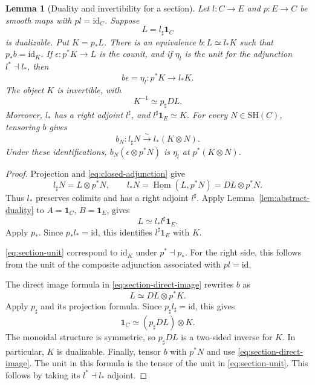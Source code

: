 \documentclass[11pt,reqno]{amsart}
\newtheorem{lemma}[theorem]{Lemma}
\theoremstyle{definition}
\theoremstyle{remark}
\theoremstyle{plain}
\numberwithin{equation}{section}
\newcommand{\SH}{\mathrm{SH}}
\newcommand{\one}{\mathbf 1}
\newcommand{\Hom}{\underline{\operatorname{Hom}}}
\begin{document}
\begin{lemma}[Duality and invertibility for a section]\label{lem:section}
Let \(l:C\to E\) and \(p:E\to C\) be smooth maps with \(pl=\mathrm{id}_C\).
Suppose
\[
 L=l_\sharp\one_C
\]
is dualizable.
Put \(K=p_*L\).
There is an equivalence \(b:L\simeq l_*K\) such that \(p_*b=\mathrm{id}_K\).
If \(\epsilon:p^*K\to L\) is the counit, and if \(\eta_l\) is the unit 
for the adjunction \(l^* \dashv l_*\), then
\begin{equation}\label{eq:section-unit}
 b\epsilon=\eta_l:p^*K\longrightarrow l_*K.
\end{equation}
The object \(K\) is invertible, with
\begin{equation}\label{eq:new-section-inverse}
 K^{-1}\simeq p_\sharp DL.
\end{equation}
Moreover, \(l_*\) has a right adjoint \(l^\sharp\), and
\(l^\sharp\one_E\simeq K\).
For every \(N\in\SH(C)\), tensoring \(b\) gives
\begin{equation}\label{eq:section-coefficients}
 b_N:l_\sharp N\xrightarrow{\ \sim\ }l_*(K\otimes N).
\end{equation}
Under these identifications, \(b_N(\epsilon\otimes p^*N)\) is \(\eta_l\) at \(p^*(K\otimes N)\).
\end{lemma}
\begin{proof}
Projection and \eqref{eq:closed-adjunction} give
\begin{equation}\label{eq:section-direct-image}
 l_\sharp N=L\otimes p^*N,\qquad
 l_*N=\Hom(L,p^*N)=DL\otimes p^*N.
\end{equation}
Thus \(l_*\) preserves colimits and has a right adjoint \(l^\sharp\).
Apply Lemma~\ref{lem:abstract-duality} to \(A=\one_C\), \(B=\one_E\), gives
\[
 L\simeq l_*l^\sharp\one_E.
\]
Apply \(p_*\).
Since \(p_*l_*=\mathrm{id}\), this identifies \(l^\sharp\one_E\) with \(K\).

\eqref{eq:section-unit} correspond to \(\mathrm{id}_K\) under \(p^*\dashv p_*\).
For the right side, this follows from the unit of the composite adjunction associated with \(pl=\mathrm{id}\).

The direct image formula in \eqref{eq:section-direct-image} rewrites \(b\) as
\begin{equation}\label{eq:new-section-self-duality}
 L\simeq DL\otimes p^*K.
\end{equation}
Apply \(p_\sharp\) and its projection formula. Since
\(p_\sharp l_\sharp=\mathrm{id}\), this gives
\[
 \one_C\simeq(p_\sharp DL)\otimes K.
\]
The monoidal structure is symmetric, so \(p_\sharp DL\) is a
two-sided inverse for \(K\). In particular, \(K\) is dualizable.
Finally, tensor \(b\) with \(p^*N\) and use \eqref{eq:section-direct-image}.
The unit in this formula is the tensor of the unit in \eqref{eq:section-unit}.
This follows by taking its \(l^*\dashv l_*\) adjoint.
\end{proof}
\end{document}
